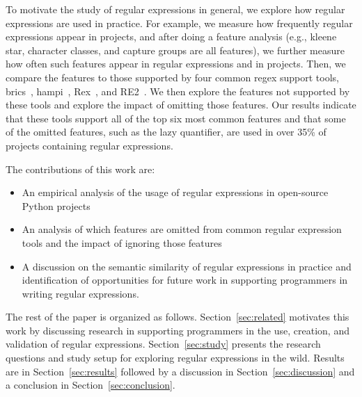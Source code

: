 To motivate the study of regular expressions in general, we explore how regular expressions are used in practice. For example, we measure how frequently regular expressions appear in projects, and after doing a feature analysis (e.g., kleene star, character classes, and capture groups are all features), we further measure how often such features appear in regular expressions and in projects. Then, we compare the features to those supported by four common regex support tools, brics~\cite{brics}, hampi~\cite{hampi}, Rex~\cite{rex}, and RE2~\cite{re2}. We then explore the features not supported by these tools and explore the impact of omitting those features. Our results indicate that these tools support all of the top six most common features and that some of the omitted features, such as the lazy quantifier, are used in over 35\% of projects containing regular expressions.

The contributions of this work are:

\begin{itemize}
	\item An empirical analysis of the usage of regular expressions in  open-source Python projects
	\item An analysis of which features are omitted from common regular expression tools and the impact of ignoring those features
	\item A discussion on the semantic similarity of regular expressions in practice and identification of opportunities for future work in supporting programmers in writing regular expressions.
\end{itemize}

The rest of the paper is organized as follows. Section~\ref{sec:related} motivates this work by discussing research in supporting programmers in the use, creation, and validation of regular expressions. Section~\ref{sec:study} presents the research questions and study setup for exploring regular expressions in the wild. Results are in Section~\ref{sec:results} followed by a discussion in Section~\ref{sec:discussion} and a conclusion in Section~\ref{sec:conclusion}.
